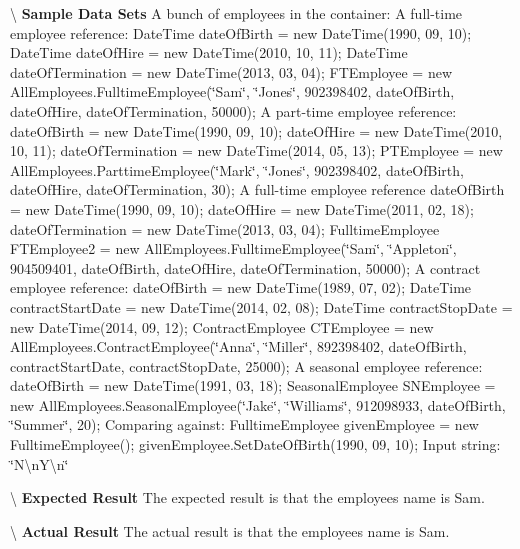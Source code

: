 \textbackslash{} {\bfseries  Sample Data Sets} A bunch of employees in the container\+: A full-\/time employee reference\+: Date\+Time date\+Of\+Birth = new Date\+Time(1990, 09, 10); Date\+Time date\+Of\+Hire = new Date\+Time(2010, 10, 11); Date\+Time date\+Of\+Termination = new Date\+Time(2013, 03, 04); F\+T\+Employee = new All\+Employees.\+Fulltime\+Employee(\char`\"{}\+Sam\char`\"{}, \char`\"{}\+Jones\char`\"{}, 902398402, date\+Of\+Birth, date\+Of\+Hire, date\+Of\+Termination, 50000); A part-\/time employee reference\+: date\+Of\+Birth = new Date\+Time(1990, 09, 10); date\+Of\+Hire = new Date\+Time(2010, 10, 11); date\+Of\+Termination = new Date\+Time(2014, 05, 13); P\+T\+Employee = new All\+Employees.\+Parttime\+Employee(\char`\"{}\+Mark\char`\"{}, \char`\"{}\+Jones\char`\"{}, 902398402, date\+Of\+Birth, date\+Of\+Hire, date\+Of\+Termination, 30); A full-\/time employee reference date\+Of\+Birth = new Date\+Time(1990, 09, 10); date\+Of\+Hire = new Date\+Time(2011, 02, 18); date\+Of\+Termination = new Date\+Time(2013, 03, 04); Fulltime\+Employee F\+T\+Employee2 = new All\+Employees.\+Fulltime\+Employee(\char`\"{}\+Sam\char`\"{}, \char`\"{}\+Appleton\char`\"{}, 904509401, date\+Of\+Birth, date\+Of\+Hire, date\+Of\+Termination, 50000); A contract employee reference\+: date\+Of\+Birth = new Date\+Time(1989, 07, 02); Date\+Time contract\+Start\+Date = new Date\+Time(2014, 02, 08); Date\+Time contract\+Stop\+Date = new Date\+Time(2014, 09, 12); Contract\+Employee C\+T\+Employee = new All\+Employees.\+Contract\+Employee(\char`\"{}\+Anna\char`\"{}, \char`\"{}\+Miller\char`\"{}, 892398402, date\+Of\+Birth, contract\+Start\+Date, contract\+Stop\+Date, 25000); A seasonal employee reference\+: date\+Of\+Birth = new Date\+Time(1991, 03, 18); Seasonal\+Employee S\+N\+Employee = new All\+Employees.\+Seasonal\+Employee(\char`\"{}\+Jake\char`\"{}, \char`\"{}\+Williams\char`\"{}, 912098933, date\+Of\+Birth, \char`\"{}\+Summer\char`\"{}, 20); Comparing against\+: Fulltime\+Employee given\+Employee = new Fulltime\+Employee(); given\+Employee.\+Set\+Date\+Of\+Birth(1990, 09, 10); Input string\+: \char`\"{}\+N\textbackslash{}n\+Y\textbackslash{}n\char`\"{}

\textbackslash{} {\bfseries  Expected Result} The expected result is that the employee\textquotesingle{}s name is Sam.

\textbackslash{} {\bfseries  Actual Result} The actual result is that the employee\textquotesingle{}s name is Sam. \hypertarget{class_the_company_1_1_tests_1_1_select_employee_tests_af066cf2d16ff4e78137853c699b0cb98}{}
